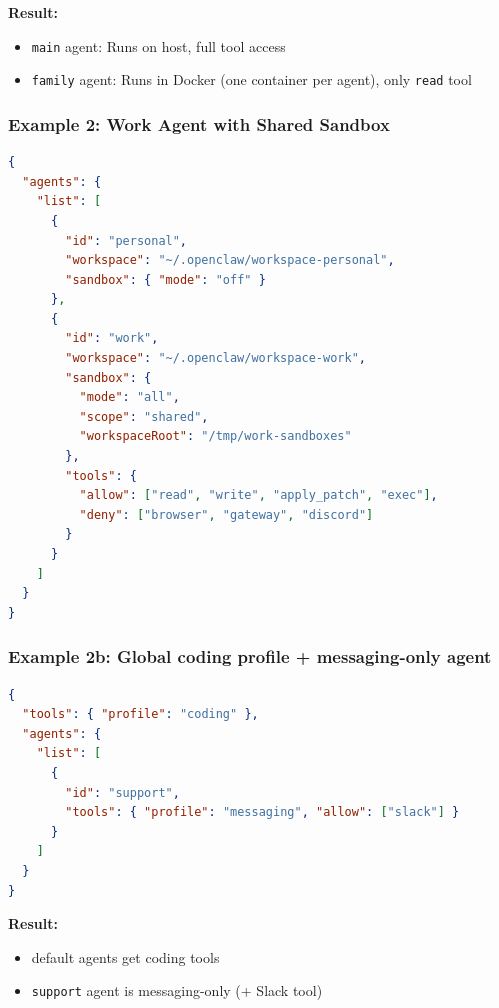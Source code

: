 \textbf{Result:}

\begin{itemize}
  \item \texttt{main} agent: Runs on host, full tool access
  \item \texttt{family} agent: Runs in Docker (one container per agent), only \texttt{read} tool
\end{itemize}


\hrulefill


\subsubsection{Example 2: Work Agent with Shared Sandbox}


\begin{lstlisting}[language=json]
{
  "agents": {
    "list": [
      {
        "id": "personal",
        "workspace": "~/.openclaw/workspace-personal",
        "sandbox": { "mode": "off" }
      },
      {
        "id": "work",
        "workspace": "~/.openclaw/workspace-work",
        "sandbox": {
          "mode": "all",
          "scope": "shared",
          "workspaceRoot": "/tmp/work-sandboxes"
        },
        "tools": {
          "allow": ["read", "write", "apply_patch", "exec"],
          "deny": ["browser", "gateway", "discord"]
        }
      }
    ]
  }
}
\end{lstlisting}


\hrulefill


\subsubsection{Example 2b: Global coding profile + messaging-only agent}


\begin{lstlisting}[language=json]
{
  "tools": { "profile": "coding" },
  "agents": {
    "list": [
      {
        "id": "support",
        "tools": { "profile": "messaging", "allow": ["slack"] }
      }
    ]
  }
}
\end{lstlisting}


\textbf{Result:}

\begin{itemize}
  \item default agents get coding tools
  \item \texttt{support} agent is messaging-only (+ Slack tool)
\end{itemize}


\hrulefill


